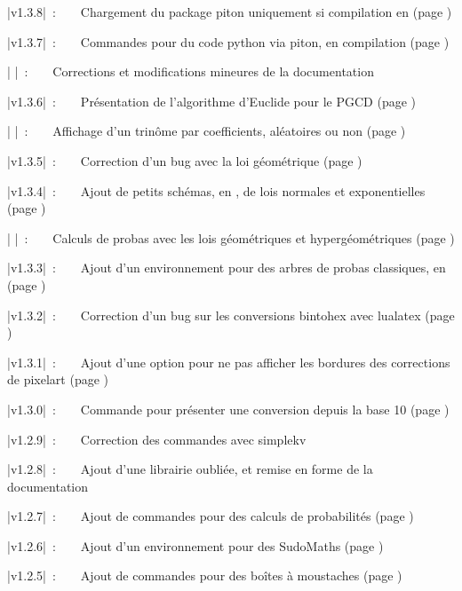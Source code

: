 \documentclass{article}
\begin{document}
{\small \bverb|v1.3.8|~:~~~~Chargement du package \textsf{piton} uniquement si compilation en \LuaLaTeX{} (page \pageref{pythonpiton})

{\small \bverb|v1.3.7|~:~~~~Commandes pour du code python via piton, en compilation \LuaLaTeX{} (page \pageref{pythonpiton})

{\small \bverb|      |~:~~~~Corrections et modifications mineures de la documentation

{\small \bverb|v1.3.6|~:~~~~Présentation de l'algorithme d'Euclide pour le PGCD (page \pageref{prespgcd})

{\small \bverb|      |~:~~~~Affichage d'un trinôme par coefficients, aléatoires ou non (page \pageref{trinome})

{\small \bverb|v1.3.5|~:~~~~Correction d'un bug avec la loi géométrique (page \pageref{calcprobas})
	
{\small \bverb|v1.3.4|~:~~~~Ajout de petits schémas, en \TikZ{}, de lois normales et exponentielles (page \pageref{schemasprobas})

{\small \bverb|      |~:~~~~Calculs de probas avec les lois géométriques et hypergéométriques (page \pageref{calcprobas})
	
{\small \bverb|v1.3.3|~:~~~~Ajout d'un environnement pour des arbres de probas classiques, en \TikZ{} (page \pageref{arbresprobas})
	
{\small \bverb|v1.3.2|~:~~~~Correction d'un bug sur les conversions bintohex avec lualatex (page \pageref{conversions})

{\small \bverb|v1.3.1|~:~~~~Ajout d'une option pour ne pas afficher les bordures des corrections de pixelart (page \pageref{pixelart})

{\small \bverb|v1.3.0|~:~~~~Commande pour présenter une conversion depuis la base 10 (page \pageref{convrestes})

{\small \bverb|v1.2.9|~:~~~~Correction des commandes avec \textsf{simplekv}

{\small \bverb|v1.2.8|~:~~~~Ajout d'une librairie \TikZ{} oubliée, et remise en forme de la documentation

{\small \bverb|v1.2.7|~:~~~~Ajout de commandes pour des calculs de probabilités (page \pageref{calcprobas})

{\small \bverb|v1.2.6|~:~~~~Ajout d'un environnement pour des SudoMaths (page \pageref{sudomaths})

{\small \bverb|v1.2.5|~:~~~~Ajout de commandes pour des boîtes à moustaches (page \pageref{boiteamoustaches})

}}}}}}}}}}}}}}}}}
\end{document}
